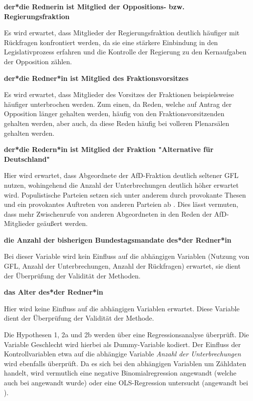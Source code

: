 \documentclass[12pt, 
    twoside=false, 
    bibliography=totoc, 
    numbers=endperiod, 
    headings=normal, 
    toc=chapterentrydotfill
    ]{scrbook}
\begin{document}
\textbf{der*die Rednerin ist Mitglied der Oppositions- bzw. Regierungsfraktion}

Es wird erwartet, dass Mitglieder der Regierungsfraktion deutlich häufiger mit Rückfragen konfrontiert werden, da sie eine stärkere Einbindung in den Legislativprozess erfahren und die Kontrolle der Regierung zu den Kernaufgaben der Opposition zählen.

\textbf{der*die Redner*in ist Mitglied des Fraktionsvorsitzes}

Es wird erwartet, dass Mitglieder des Vorsitzes der Fraktionen beispielsweise häufiger unterbrochen werden. Zum einen, da Reden, welche auf Antrag der Opposition länger gehalten werden, häufig von den Fraktionsvorsitzenden gehalten werden, aber auch, da diese Reden häufig bei volleren Plenarsälen gehalten werden.

\textbf{der*die Redern*in ist Mitglied der Fraktion "Alternative für Deutschland"}

Hier wird erwartet, dass Abgeordnete der AfD-Fraktion deutlich seltener GFL nutzen, wohingehend die Anzahl der Unterbrechungen deutlich höher erwartet wird. Populistische Parteien setzen sich unter anderem durch provokante Thesen und ein provokantes Auftreten von anderen Parteien ab \parencites[vgl.][]{decker_populismus_2006}{priester_2012}. Dies lässt vermuten, dass mehr Zwischenrufe von anderen Abgeordneten in den Reden der AfD-Mitglieder geäußert werden.

\textbf{die Anzahl der bisherigen Bundestagsmandate des*der Redner*in}

Bei dieser Variable wird kein Einfluss auf die abhängigen Variablen (Nutzung von GFL, Anzahl der Unterbrechungen, Anzahl der Rückfragen) erwartet, sie dient der Überprüfung der Validität der Methoden.

\textbf{das Alter des*der Redner*in}

Hier wird keine Einfluss auf die abhängigen Variablen erwartet. Diese Variable dient der Überprüfung der Validität der Methode.

Die {Hypothesen 1, 2a und 2b} werden über eine Regressionsanalyse überprüft. Die Variable Geschlecht wird hierbei als Dummy-Variable kodiert. Der Einfluss der Kontrollvariablen etwa auf die abhängige Variable \emph{Anzahl der Unterbrechungen} wird ebenfalls überprüft. Da es sich bei den abhängigen Variablen um Zähldaten handelt, wird vermutlich eine negative Binomialregression angewandt (welche auch bei \textcite{back_2014} angewandt wurde) oder eine OLS-Regression untersucht (angewandt bei \textcite{coffe_2013}).
\end{document}
